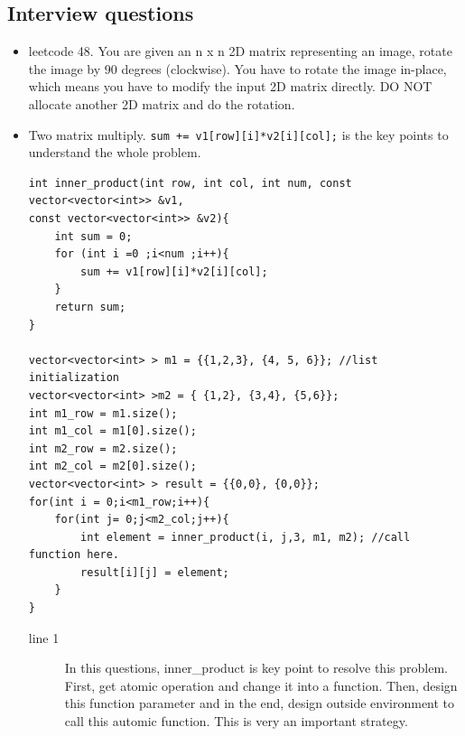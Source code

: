 \documentclass[a4paper,11pt,twoside]{book}
\begin{document}
\subsection{Interview questions}
\begin{itemize}
	
	\item leetcode 48. You are given an n x n 2D matrix representing an image, rotate the image by 90 degrees (clockwise). You have to rotate the image in-place, which means you have to modify the input 2D matrix directly. DO NOT allocate another 2D matrix and do the rotation.
	
	\item Two matrix multiply. \texttt{sum += v1[row][i]*v2[i][col];} is the key points to understand the whole problem. 
\begin{lstlisting}[]
int inner_product(int row, int col, int num, const vector<vector<int>> &v1, 
const vector<vector<int>> &v2){
	int sum = 0;
	for (int i =0 ;i<num ;i++){
		sum += v1[row][i]*v2[i][col];
	}
	return sum;
}

vector<vector<int> > m1 = {{1,2,3}, {4, 5, 6}}; //list initialization
vector<vector<int> >m2 = { {1,2}, {3,4}, {5,6}};
int m1_row = m1.size();
int m1_col = m1[0].size();
int m2_row = m2.size();
int m2_col = m2[0].size();
vector<vector<int> > result = {{0,0}, {0,0}};
for(int i = 0;i<m1_row;i++){
	for(int j= 0;j<m2_col;j++){
		int element = inner_product(i, j,3, m1, m2); //call function here.
		result[i][j] = element;
	}
}		
\end{lstlisting}
	
	\begin{description}	
		\item[line 1] In this questions, inner\_product is key point to resolve this problem. First, get atomic operation and change it into a function. Then, design this function parameter and in the end, design outside environment to call this automic function. This is very an important strategy. 
	\end{description}
	

\end{itemize}
\end{document}
